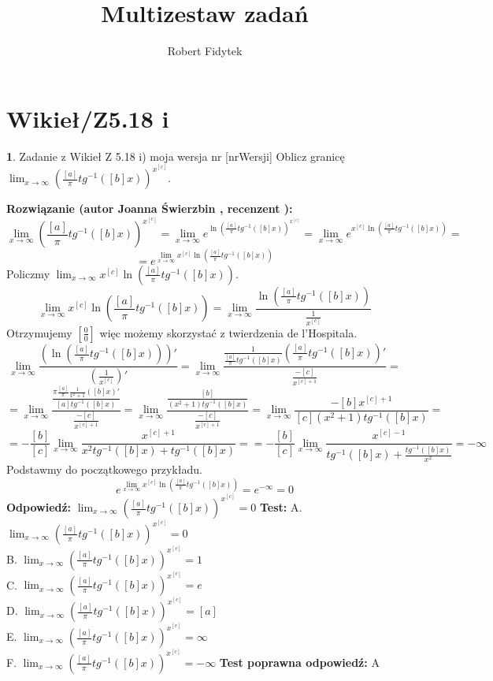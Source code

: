 \documentclass[12pt, a4paper]{article}
\title{Multizestaw zadań}
\author{Robert Fidytek}
\date{}
\theoremstyle{definition} %
\newtheorem{zad}{}
\newcommand{\kategoria}[1]{\section{#1}} %
\newcommand{\zadStart}[1]{\begin{zad}#1\newline} %
\newcommand{\zadStop}{\end{zad}}   %
\newcommand{\rozwStart}[2]{\noindent \textbf{Rozwiązanie (autor #1 , recenzent #2): }\newline} %
\newcommand{\rozwStop}{\newline}                                            %
\newcommand{\odpStart}{\noindent \textbf{Odpowiedź:}\newline}    %
\newcommand{\odpStop}{\newline}                                             %
\newcommand{\testStart}{\noindent \textbf{Test:}\newline} %
\newcommand{\testStop}{\newline} %
\newcommand{\kluczStart}{\noindent \textbf{Test poprawna odpowiedź:}\newline} %
\newcommand{\kluczStop}{\newline} %
\begin{document}
\maketitle


\kategoria{Wikieł/Z5.18 i}
\zadStart{Zadanie z Wikieł Z 5.18 i) moja wersja nr [nrWersji]}
Oblicz granicę $\lim_{x \rightarrow \infty} \left(\frac{[a]}{\pi} tg^{-1}([b]x) \right)^{x^{[c]}}$.
\zadStop
\rozwStart{Joanna Świerzbin}{}
$$ \lim_{x \rightarrow \infty} \left(\frac{[a]}{\pi} tg^{-1}([b]x) \right)^{x^{[c]}} =\lim_{x \rightarrow \infty}  e^{\ln \left(\frac{[a]}{\pi} tg^{-1}([b]x) \right)^{x^{[c]}}} = \lim_{x \rightarrow \infty}  e^{ {x^{[c]}} \ln \left(\frac{[a]}{\pi} tg^{-1}([b]x) \right)} = $$
$$=  e^{\lim_{x \rightarrow \infty} {x^{[c]}} \ln \left(\frac{[a]}{\pi} tg^{-1}([b]x) \right)} $$
Policzmy $ \lim_{x \rightarrow \infty} {x^{[c]}} \ln \left(\frac{[a]}{\pi} tg^{-1}([b]x) \right)$.
$$\lim_{x \rightarrow \infty} {x^{[c]}} \ln \left(\frac{[a]}{\pi} tg^{-1}([b]x) \right)= \lim_{x \rightarrow \infty} \frac{\ln \left(\frac{[a]}{\pi} tg^{-1}([b]x) \right)}{\frac{1}{x^{[c]}}}$$
Otrzymujemy $ \left[ \frac{0}{0} \right] $ więc możemy skorzystać z twierdzenia de l'Hospitala.
$$\lim_{x \rightarrow \infty} \frac{\left(\ln \left(\frac{[a]}{\pi} tg^{-1}([b]x) \right)\right)'}{\left(\frac{1}{x^{[c]}}\right)'}= \lim_{x \rightarrow \infty} \frac{\frac{1}{\frac{[a]}{\pi} tg^{-1}([b]x)}\left( \frac{[a]}{\pi} tg^{-1}([b]x) \right)'}{\frac{-[c]}{x^{[c]+1}}}=$$
$$= \lim_{x \rightarrow \infty} \frac{\frac{\pi \frac{[a]}{\pi} \frac{1}{x^2+1}([b]x)'}{[a] tg^{-1}([b]x)}}{\frac{-[c]}{x^{[c]+1}}}=
 \lim_{x \rightarrow \infty} \frac{\frac{[b]}{(x^2+1) tg^{-1}([b]x)}}{\frac{-[c]}{x^{[c]+1}}}=
\lim_{x \rightarrow \infty}\frac{-[b]x^{[c]+1}}{[c](x^2+1) tg^{-1}([b]x)}=$$
$$=-\frac{[b]}{[c]}\lim_{x \rightarrow \infty}\frac{x^{[c]+1}}{x^2 tg^{-1}([b]x) + tg^{-1}([b]x)}=
=-\frac{[b]}{[c]}\lim_{x \rightarrow \infty}\frac{x^{[c]-1}}{tg^{-1}([b]x) + \frac{ tg^{-1}([b]x)}{x^2}} = -\infty$$
Podstawmy do początkowego przykładu.
$$e^{\lim_{x \rightarrow \infty} {x^{[c]}} \ln \left(\frac{[a]}{\pi} tg^{-1}([b]x) \right)} = e^{-\infty} =0 $$
\rozwStop
\odpStart
$ \lim_{x \rightarrow \infty} \left(\frac{[a]}{\pi} tg^{-1}([b]x) \right)^{x^{[c]}}= 0 $
\odpStop
\testStart
A. $ \lim_{x \rightarrow \infty} \left(\frac{[a]}{\pi} tg^{-1}([b]x) \right)^{x^{[c]}}= 0 $\\
B. $ \lim_{x \rightarrow \infty} \left(\frac{[a]}{\pi} tg^{-1}([b]x) \right)^{x^{[c]}}= 1 $\\
C. $ \lim_{x \rightarrow \infty} \left(\frac{[a]}{\pi} tg^{-1}([b]x) \right)^{x^{[c]}}= e $\\
D. $ \lim_{x \rightarrow \infty} \left(\frac{[a]}{\pi} tg^{-1}([b]x) \right)^{x^{[c]}}= [a] $\\
E. $ \lim_{x \rightarrow \infty} \left(\frac{[a]}{\pi} tg^{-1}([b]x) \right)^{x^{[c]}}= \infty $\\
F. $ \lim_{x \rightarrow \infty} \left(\frac{[a]}{\pi} tg^{-1}([b]x) \right)^{x^{[c]}}= -\infty $
\testStop
\kluczStart
A
\kluczStop
\end{document}
